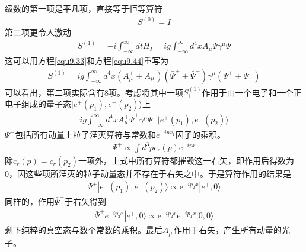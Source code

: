 级数的第一项是平凡项，直接等于恒等算符
\begin{align}\label{equ9.71}
S^{(0)}=I
\end{align}
第二项更令人激动
\begin{align}\label{equ9.72}
S^{(1)}=-i\int_{-\infty}^\infty dt H_I = ig\int_{-\infty}^\infty d^4x A_\mu \bar{\Psi}\gamma^\mu\Psi
\end{align}
这可以用方程\ref{equ9.33}和方程\ref{equ9.44}重写为
\begin{align}\label{equ9.73}
S^{(1)}=ig\int_{-\infty}^\infty d^4x (A_\mu^++A_\mu^-) (\bar{\Psi}^++\bar{\Psi}^-)\gamma^\mu(\Psi^++\Psi^-)
\end{align}
可以看出，第二项实际含有8项。考虑将其中一项$S_1^{(1)}$作用于由一个电子和一个正电子组成的量子态$|e^+(p_1),e^-(p_2)\rangle$上
\begin{gather*}
ig\int_{-\infty}^{\infty}d^4xA^+_\mu\bar{\Psi}^+\gamma^\mu\Psi^+|e^+(p_1),e^-(p_2)\rangle
\end{gather*}
$\Psi^+$包括所有动量上粒子湮灭算符与常数和$e^{-ip x_1}$因子的乘积。
\begin{gather*}
\Psi^+\propto\int d^3p c_r(p) \text{e}^{-ipx}
\end{gather*}
除$c_r(p)=c_r(p_2)$一项外，上式中所有算符都摧毁这一右矢，即作用后得数为0，因这些项所湮灭的粒子动量态并不存在于右矢之中。于是算符作用的结果是
\begin{gather}
\Psi^+|e^+(p_1),e^-(p_2)\rangle\propto \text{e}^{-ip_2x}|e^+,0\rangle
\end{gather}
同样的，作用$\bar{\Psi}^+$于右矢得到
\begin{gather}
\bar{\Psi}^+e^{-ip_2x}|e^+,0\rangle\propto \text{e}^{-ip_2 x}\text{e}^{-ip_1x}|0,0\rangle
\end{gather}
剩下纯粹的真空态与数个常数的乘积。最后$A^+_\mu$作用于右矢，产生所有动量的光子。
{}
